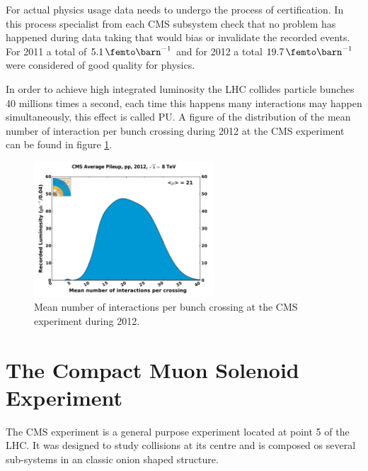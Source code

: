 For actual physics usage data needs to undergo the process of certification. In this process specialist from each \gls{CMS} subsystem check that no problem has happened during data taking that would bias or invalidate the recorded events. For 2011 a total of $5.1\,\femto\barn^{-1}$ and for 2012 a total $19.7\,\femto\barn^{-1}$ were considered of good quality for physics. 

In order to achieve high integrated luminosity the \gls{LHC} collides particle bunches 40 millions times a second, each time this happens many interactions may happen simultaneously, this effect is called \gls{PU}. A figure of the distribution of the mean number of interaction per bunch crossing during 2012 at the CMS experiment can be found in figure \ref{FIGURE:ExperimentalApparatus_CMS_PileIp_pp_2012}.

\begin{figure}[!htb]
  \centering
  \includegraphics[width=0.60\textwidth]{Chapter02/CMS/Images/CMS_PileIp_pp_2012}
  \caption{Mean number of interactions per bunch crossing at the CMS experiment during 2012.}
  \label{FIGURE:ExperimentalApparatus_CMS_PileIp_pp_2012}
\end{figure}

\section{The Compact Muon Solenoid Experiment}
\label{SECTION:ExperimentalApparatus_CMS}

The \gls{CMS} experiment is a general purpose experiment located at point 5 of the \gls{LHC}. It was designed to study collisions at its centre and is composed os several sub-systems in an classic onion shaped structure.

